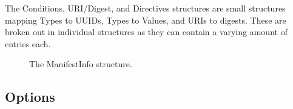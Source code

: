 \documentclass[0-thesis.tex]{subfiles}
\begin{document}
The Conditions, URI/Digest, and Directives structures are small structures mapping Types
to UUIDs, Types to Values, and URIs to digests. These are broken out in individual
structures as they can contain a varying amount of entries each. 
\begin{figure}
    \caption{The ManifestInfo structure.}
    \label{fig:manifest-info}
\end{figure}

\subsection{Options}
\label{ssec:options}
\end{document}

